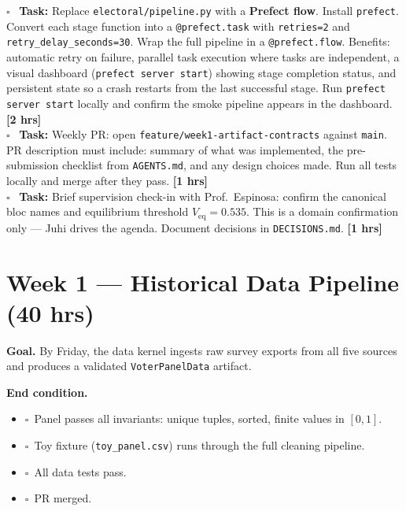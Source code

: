 \documentclass[11pt]{article}
\newcommand{\hrs}[1]{\textbf{[#1 hrs]}}
\newcommand{\veq}{V_{\mathrm{eq}}}
\newcommand{\task}[2]{%
  \noindent\textbf{Task:} #1 \hfill \hrs{#2}\\}
\newcommand{\done}{\textcolor{sectionblue}{$\square$}\ }
\begin{document}
\begin{taskbox}
\done \task{Replace \texttt{electoral/pipeline.py} with a \textbf{Prefect flow}.
  Install \texttt{prefect}. Convert each stage function into a
  \texttt{@prefect.task} with \texttt{retries=2} and \texttt{retry\_delay\_seconds=30}.
  Wrap the full pipeline in a \texttt{@prefect.flow}. Benefits: automatic retry
  on failure, parallel task execution where tasks are independent, a visual
  dashboard (\texttt{prefect server start}) showing stage completion status,
  and persistent state so a crash restarts from the last successful stage.
  Run \texttt{prefect server start} locally and confirm the smoke pipeline
  appears in the dashboard.}{2}

\done \task{Weekly PR: open \texttt{feature/week1-artifact-contracts} against
  \texttt{main}. PR description must include: summary of what was implemented,
  the pre-submission checklist from \texttt{AGENTS.md}, and any design choices
  made. Run all tests locally and merge after they pass.}{1}

\done \task{Brief supervision check-in with Prof.\ Espinosa: confirm the canonical
  bloc names and equilibrium threshold $\veq = 0.535$. This is a domain
  confirmation only --- Juhi drives the agenda. Document decisions in
  \texttt{DECISIONS.md}.}{1}
\end{taskbox}

\newpage

\section{Week 1 --- Historical Data Pipeline (40 hrs)}

\textbf{Goal.} By Friday, the data kernel ingests raw survey exports from all
five sources and produces a validated \texttt{VoterPanelData} artifact.

\textbf{End condition.}
\begin{itemize}[leftmargin=1.6em, itemsep=1pt]
  \item \done Panel passes all invariants: unique tuples, sorted, finite values in $[0,1]$.
  \item \done Toy fixture (\texttt{toy\_panel.csv}) runs through the full cleaning pipeline.
  \item \done All data tests pass.
  \item \done PR merged.
\end{itemize}
\end{document}
